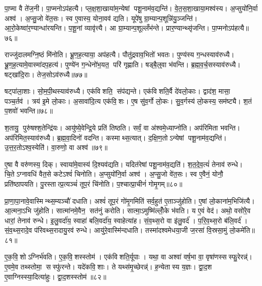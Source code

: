 पा॒प्मा वै ते॑ज॒नी। पा॒प्मनोऽप॑हत्यै। प्ल॒क्ष॒शा॒खाया॑म॒न्येषां पशू॒नाम॑व॒द्यन्ति॑। वे॒त॒स॒शा॒खाया॒मश्व॑स्य। अ॒प्सुयो॑नि॒र्वा अश्व॑। अ॒प्सु॒जो वे॑त॒सः। स्व ए॒वास्य॒ योना॒वव॑ द्यति। यूपे॑षु ग्रा॒म्यान्प॒शून्नि॑यु॒ञ्जन्ति॑। आ॒रो॒केष्वा॑र॒ण्यान्धा॑रयन्ति। प॒शू॒नां व्यावृ॑त्त्यै। आ ग्रा॒म्यान्प॒शूल्लँभ॑न्ते। प्रार॒ण्यान्थ्सृ॑जन्ति। पा॒प्मनोऽप॑हत्यै॥७६॥\anuvakamend[अश्व॑स्य॒ व्यावृ॑त्त्यै॒ त्रीणि॑ च]

राज्जु॑दालमग्नि॒ष्ठं मि॑नोति। भ्रू॒ण॒ह॒त्याया॒ अप॑हत्यै। पौतु॑द्रवाव॒भितो॑ भवतः। पुण्य॑स्य ग॒न्धस्याव॑रुध्यै। भ्रू॒ण॒ह॒त्यामे॒वास्मा॑दप॒हत्य॑। पुण्ये॑न ग॒न्धेनो॑भ॒यत॒ परि॑ गृह्णाति। षड्बै॒ल्॒वा भ॑वन्ति। ब्र॒ह्म॒व॒र्च॒सस्याव॑रुध्यै। षट्खा॑दि॒राः। तेज॒सोऽव॑रुध्यै॥७७॥

षट्पा॑ला॒शाः। सो॒म॒पी॒थस्याव॑रुध्यै। एक॑विशति॒ संप॑द्यन्ते। एक॑विशति॒र्वै दे॑वलो॒काः। द्वाद॑श॒ मासा॒ पञ्च॒र्तव॑। त्रय॑ इ॒मे लो॒काः। अ॒सावा॑दि॒त्य एक॑वि॒शः। ए॒ष सु॑व॒र्गो लो॒कः। सु॒व॒र्गस्य॑ लो॒कस्य॒ सम॑ष्ट्यै। श॒तं प॒शवो॑ भवन्ति॥७८॥

श॒तायु॒ पुरु॑षश्श॒तेन्द्रि॑यः। आयु॑ष्ये॒वेन्द्रि॒ये प्रति॑ तिष्ठति। सर्वं॒ वा अ॑श्वमे॒ध्याप्नो॑ति। अप॑रिमिता भवन्ति। अप॑रिमित॒स्याव॑रुध्यै। ब्र॒ह्म॒वा॒दिनो॑ वदन्ति। कस्माथ्स॒त्यात्। द॒क्षि॒ण॒तोऽन्येषां पशू॒नाम॑व॒द्यन्ति॑। उ॒त्त॒र॒तोऽश्व॒स्येति॑। वा॒रुणो॒ वा अश्व॑॥७९॥

ए॒षा वै वरु॑णस्य॒ दिक्। स्वाया॑मे॒वास्य॑ दि॒श्यव॑द्यति। यदित॑रेषां पशू॒नाम॑व॒द्यति॑। श॒त॒दे॒व॒त्यं॑ तेनाव॑ रुन्धे। चि॒तेऽग्नावधि॑ वैत॒से कटेऽश्वं॑ चिनोति। अ॒प्सुयो॑नि॒र्वा अश्व॑। अ॒प्सु॒जो वे॑त॒सः। स्व ए॒वैनं॒ योनौ॒ प्रति॑ष्ठापयति। पु॒रस्तात्प्र॒त्यञ्चं॑ तूप॒रं चि॑नोति। प॒श्चात्प्रा॒चीनं॑ गोमृ॒गम्॥८०॥

प्रा॒णा॒पा॒नावे॒वास्मिन्थ्स॒म्यञ्चौ॑ दधाति। अश्वं॑ तूप॒रं गो॑मृ॒गमिति॑ सर्व॒हुत॑ ए॒ताञ्जु॑होति। ए॒षां लो॒काना॑म॒भिजि॑त्यै। आ॒त्मना॒ऽभि जु॑होति। सात्मा॑नमे॒वैन॒ सत॑नुं करोति। सात्मा॒ऽमुष्मि॑ल्लोँ॒के भ॑वति। य ए॒वं वेद॑। अथो॒ वसो॑रे॒व धारां॒ तेनाव॑ रुन्धे। इ॒लु॒वर्दा॑य॒ स्वाहा॑ बलि॒वर्दा॑य॒ स्वाहेत्या॑ह। सं॒व॒थ्स॒रो वा इ॑लु॒वर्द॑। प॒रि॒व॒थ्स॒रो ब॑लि॒वर्द॑। सं॒व॒थ्स॒रादे॒व प॑रिवथ्स॒रादायु॒रव॑ रुन्धे। आयु॑रे॒वास्मि॑न्दधाति। तस्मा॑दश्वमेधया॒जी ज॒रसा॑ वि॒स्रसा॒मुं लो॒कमे॑ति॥८१॥\anuvakamend[तेज॒सोऽव॑रुध्यै भव॒न्त्यश्वो॑ गोमृ॒गमि॑लु॒वर्द॑श्च॒त्वारि॑ च]

ए॒क॒वि॒शोऽग्निर्भ॑वति। ए॒क॒वि॒शस्स्तोम॑। एक॑विशति॒र्यूपाः। यथा॒ वा अश्वा॑ वर्\mbox{}ष॒भा वा॒ वृषा॑णस्सस्फु॒रेरन्न्॑। ए॒वमे॒व तथ्स्तोमा॒ सस्फु॑रन्ते। यदे॑कवि॒शाः। ते यथ्स॑मृ॒च्छेरन्न्॑। ह॒न्येतास्य य॒ज्ञः। द्वा॒द॒श ए॒वाग्निस्स्या॒दित्या॑हुः। द्वा॒द॒शस्स्तोम॑॥८२॥

